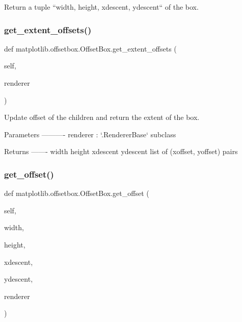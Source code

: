 \begin{DoxyVerb}Return a tuple ``width, height, xdescent, ydescent`` of the box.\end{DoxyVerb}
 \mbox{\label{classmatplotlib_1_1offsetbox_1_1OffsetBox_ad633bbf15cc3edfdeae10490453f54af}} 
\subsubsection{\texorpdfstring{get\+\_\+extent\+\_\+offsets()}{get\_extent\_offsets()}}
{\footnotesize\ttfamily def matplotlib.\+offsetbox.\+Offset\+Box.\+get\+\_\+extent\+\_\+offsets (\begin{DoxyParamCaption}\item[{}]{self,  }\item[{}]{renderer }\end{DoxyParamCaption})}

\begin{DoxyVerb}Update offset of the children and return the extent of the box.

Parameters
----------
renderer : `.RendererBase` subclass

Returns
-------
width
height
xdescent
ydescent
list of (xoffset, yoffset) pairs
\end{DoxyVerb}
 \mbox{\label{classmatplotlib_1_1offsetbox_1_1OffsetBox_a3fcbad2280a49099dfe34becb0826cad}} 
\subsubsection{\texorpdfstring{get\+\_\+offset()}{get\_offset()}}
{\footnotesize\ttfamily def matplotlib.\+offsetbox.\+Offset\+Box.\+get\+\_\+offset (\begin{DoxyParamCaption}\item[{}]{self,  }\item[{}]{width,  }\item[{}]{height,  }\item[{}]{xdescent,  }\item[{}]{ydescent,  }\item[{}]{renderer }\end{DoxyParamCaption})}

